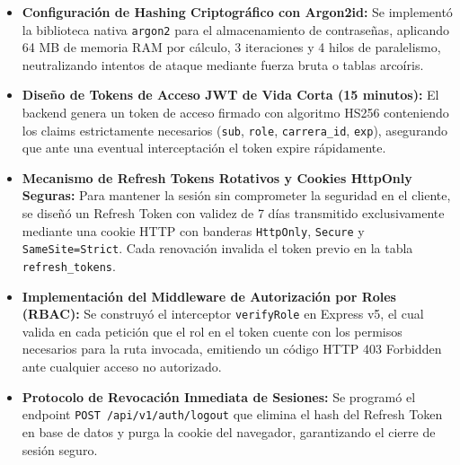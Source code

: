 \documentclass[12pt,a4paper]{article}
\begin{document}
\begin{itemize}[leftmargin=1.5em, itemsep=4pt]
    \item \textbf{Configuración de Hashing Criptográfico con Argon2id:} Se implementó la biblioteca nativa \texttt{argon2} para el almacenamiento de contraseñas, aplicando 64 MB de memoria RAM por cálculo, 3 iteraciones y 4 hilos de paralelismo, neutralizando intentos de ataque mediante fuerza bruta o tablas arcoíris.
    \item \textbf{Diseño de Tokens de Acceso JWT de Vida Corta (15 minutos):} El backend genera un token de acceso firmado con algoritmo HS256 conteniendo los claims estrictamente necesarios (\texttt{sub}, \texttt{role}, \texttt{carrera\_\allowbreak  id}, \texttt{exp}), asegurando que ante una eventual interceptación el token expire rápidamente.
    \item \textbf{Mecanismo de Refresh Tokens Rotativos y Cookies HttpOnly Seguras:} Para mantener la sesión sin comprometer la seguridad en el cliente, se diseñó un Refresh Token con validez de 7 días transmitido exclusivamente mediante una cookie HTTP con banderas \texttt{HttpOnly}, \texttt{Secure} y \texttt{SameSite=Strict}. Cada renovación invalida el token previo en la tabla \texttt{refresh\_\allowbreak  tokens}.
    \item \textbf{Implementación del Middleware de Autorización por Roles (RBAC):} Se construyó el interceptor \texttt{verifyRole} en Express v5, el cual valida en cada petición que el rol en el token cuente con los permisos necesarios para la ruta invocada, emitiendo un código HTTP 403 Forbidden ante cualquier acceso no autorizado.
    \item \textbf{Protocolo de Revocación Inmediata de Sesiones:} Se programó el endpoint \texttt{POST /\allowbreak  api/\allowbreak   v1/\allowbreak   auth/\allowbreak   logout} que elimina el hash del Refresh Token en base de datos y purga la cookie del navegador, garantizando el cierre de sesión seguro.
\end{itemize}
\end{document}
